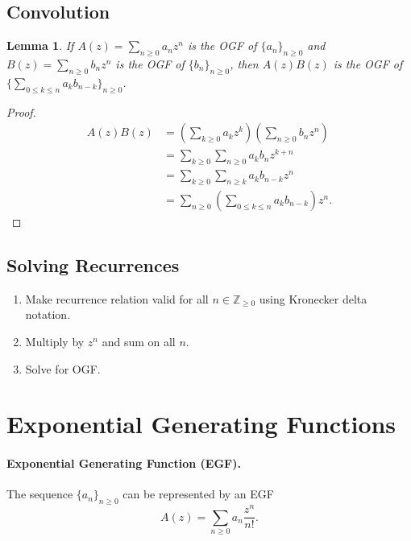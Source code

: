 \documentclass{article}
\newtheorem{lemma}{Lemma}
\begin{document}
\subsection{Convolution}

\begin{lemma}
  If $A(z) = \sum_{n \geq 0}a_nz^n$ is the OGF of $\{a_n\}_{n \geq 0}$ and
  $B(z) = \sum_{n \geq 0}b_nz^n$ is the OGF of $\{b_n\}_{n \geq 0}$, then
  $A(z)B(z)$ is the OGF of $\{\sum_{0 \leq k \leq n}a_kb_{n - k}\}_{n \geq 0}$.
\end{lemma}

\begin{proof}
  \begin{align*}
    A(z)B(z) &= \left(\sum_{k \geq 0} a_kz^k\right) \left(\sum_{n \geq 0}
      b_nz^n\right) \\
      &= \sum_{k \geq 0} \sum_{n \geq 0} a_kb_nz^{k + n} \\
      &= \sum_{k \geq 0} \sum_{n \geq k} a_kb_{n - k}z^n \\
      &= \sum_{n \geq 0} \left(\sum_{0 \leq k \leq n} a_kb_{n - k}\right) z^n.
  \end{align*}
\end{proof}

\subsection{Solving Recurrences}

\begin{enumerate}
  \item Make recurrence relation valid for all $n \in \mathbb{Z}_{\geq 0}$
    using Kronecker delta notation.
  \item Multiply by $z^n$ and sum on all $n$.
  \item Solve for OGF.
\end{enumerate}

\section{Exponential Generating Functions}

\paragraph{Exponential Generating Function (EGF).} The sequence $\{a_n\}_{n
\geq 0}$ can be represented by an EGF \begin{equation*}
  A(z) = \sum_{n \geq 0}a_n\frac{z^n}{n!}.
\end{equation*}
\end{document}
